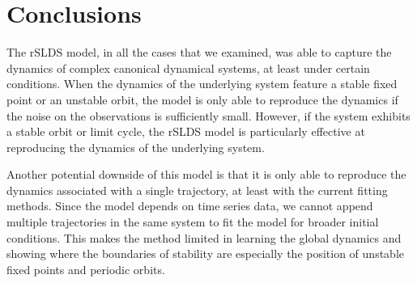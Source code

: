 \section{Conclusions}

The rSLDS model, in all the cases that we examined, was able to capture the dynamics of complex canonical dynamical systems, at least under certain conditions. When the dynamics of the underlying system feature a stable fixed point or an unstable orbit, the model is only able to reproduce the dynamics if the noise on the observations is sufficiently small. However, if the system exhibits a stable orbit or limit cycle, the rSLDS model is particularly effective at reproducing the dynamics of the underlying system.

Another potential downside of this model is that it is only able to reproduce the dynamics associated with a single trajectory, at least with the current fitting methods. Since the model depends on time series data, we cannot append multiple trajectories in the same system to fit the model for broader initial conditions. This makes the method limited in learning the global dynamics and showing where the boundaries of stability are especially the position of unstable fixed points and periodic orbits.

\begin{comment}
The method can be very successfully applied to systems with a periodic orbit or strange attractor and the goal is to find the dynamics of this orbit. We can remark that this method is very limited in its ability to give an estimation on the linear estimation of the global dynamics. Unlike the SINDY algorithm \cite{} it is currently not possible to learn from data from multiple trajectories. This makes the method limited in learning the global dynamics and showing where the boundaries of stability are especially the position of unstable fixed points and periodic orbits. This makes the method only applicable for initial conditions that lead to periodic or bounded trajectories. The extension of implementing the ability to handle multiple trajectories will enhance the range of problems this method can be applied to.
\end{comment}
